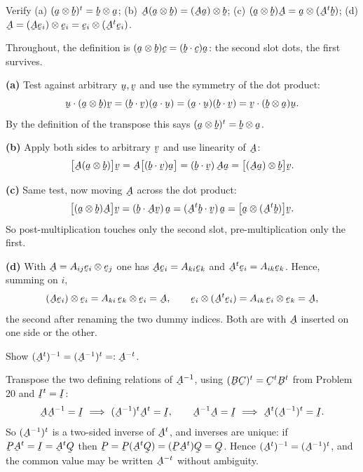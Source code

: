 \begin{problem}
Verify (a) $(\ba\otimes\bb)^t=\bb\otimes\ba$; (b)
$\bA(\ba\otimes\bb)=(\bA\ba)\otimes\bb$; (c)
$(\ba\otimes\bb)\bA=\ba\otimes(\bA^{t}\bb)$; (d)
$\bA=(\bA\be_i)\otimes\be_i=\be_i\otimes(\bA^{t}\be_i)$.
\end{problem}
\begin{solution}
Throughout, the definition is $(\ba\otimes\bb)\bc=(\ip\bb\bc)\ba$: the
second slot dots, the first survives.

\textbf{(a)} Test against arbitrary $\bu,\bv$ and use the symmetry of the
dot product:
\[
   \ip{\bu}{(\ba\otimes\bb)\bv}=(\ip\bb\bv)(\ip\ba\bu)
   =(\ip\ba\bu)(\ip\bb\bv)
   =\ip{\bv}{(\bb\otimes\ba)\bu} .
\]
By the definition of the transpose this says
$(\ba\otimes\bb)^{t}=\bb\otimes\ba$.

\textbf{(b)} Apply both sides to arbitrary $\bv$ and use linearity of
$\bA$:
\[
   \big[\bA(\ba\otimes\bb)\big]\bv=\bA\big[(\ip\bb\bv)\ba\big]
   =(\ip\bb\bv)\,\bA\ba
   =\big[(\bA\ba)\otimes\bb\big]\bv .
\]

\textbf{(c)} Same test, now moving $\bA$ across the dot product:
\[
   \big[(\ba\otimes\bb)\bA\big]\bv=(\ip{\bb}{\bA\bv})\,\ba
   =(\ip{\bA^{t}\bb}{\bv})\,\ba
   =\big[\ba\otimes(\bA^{t}\bb)\big]\bv .
\]
So post-multiplication touches only the second slot, pre-multiplication
only the first.

\textbf{(d)} With $\bA=A_{ij}\be_i\otimes\be_j$ one has
$\bA\be_i=A_{ki}\be_k$ and $\bA^{t}\be_i=A_{ik}\be_k$. Hence, summing on
$i$,
\[
   (\bA\be_i)\otimes\be_i=A_{ki}\,\be_k\otimes\be_i=\bA,
   \qquad
   \be_i\otimes(\bA^{t}\be_i)=A_{ik}\,\be_i\otimes\be_k=\bA ,
\]
the second after renaming the two dummy indices. Both are  with
$\bA$ inserted on one side or the other.
\end{solution}

\begin{problem}
Show $(\bA^{t})^{-1}=(\bA^{-1})^{t}=:\bA^{-t}$.
\end{problem}
\begin{solution}
Transpose the two defining relations of $\bA^{-1}$, using
$(\bB\bC)^{t}=\bC^{t}\bB^{t}$ from Problem 20 and $\I^{t}=\I$:
\[
   \bA\bA^{-1}=\I\ \Longrightarrow\ (\bA^{-1})^{t}\bA^{t}=\I,
   \qquad
   \bA^{-1}\bA=\I\ \Longrightarrow\ \bA^{t}(\bA^{-1})^{t}=\I .
\]
So $(\bA^{-1})^{t}$ is a two-sided inverse of $\bA^{t}$, and inverses are
unique: if $\bP\bA^{t}=\I=\bA^{t}\bQ$ then
$\bP=\bP(\bA^{t}\bQ)=(\bP\bA^{t})\bQ=\bQ$. Hence
$(\bA^{t})^{-1}=(\bA^{-1})^{t}$, and the common value may be written
$\bA^{-t}$ without ambiguity.
\end{solution}

